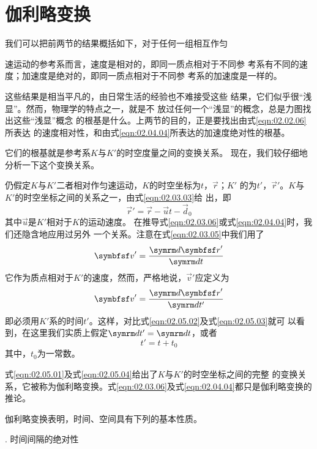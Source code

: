 \section{伽利略变换}\label{sec:02.05}

我们可以把前两节的结果概括如下，对于任何一组相互作匀

\noindent 速运动的参考系而言，速度是相对的，即同一质点相对于不同参
考系有不同的速度；加速度是绝对的，即同一质点相对于不同参
考系的加速度是一样的。

这些结果是相当平凡的，由日常生活的经验也不难接受这些
结果，它们似乎很“浅显”。然而，物理学的特点之一，就是不
放过任何一个“浅显”的概念，总是力图找出这些“浅显”概念
的根基是什么。上两节的目的，正是要找出由式\eqref{eqn:02.02.06}所表达
的速度相对性，和由式\eqref{eqn:02.04.04}所表达的加速度绝对性的根基。

它们的根基就是参考系$K$与$K'$的时空度量之间的变换关系。
现在，我们较仔细地分析一下这个变换关系。

仍假定$K$与$K'$二者相对作匀速运动，$K$的时空坐标为$t$，$\vec{r}$；$K'$
的为$t'$，$\vec{r}'$。$K$与$K'$的时空坐标之间的关系之一，由式\eqref{eqn:02.03.03}给
出，即
\begin{equation}\label{eqn:02.05.01}
  \vec{r}'=\vec{r}-\vec{u} t -\vec{d}_0
\end{equation}
其中$\vec{u}$是$K'$相对于$K$的运动速度。
在推导式\eqref{eqn:02.03.06}或式\eqref{eqn:02.04.04}时，我们还隐含地应用过另外
一个关系。注意在式\eqref{eqn:02.03.05}中我们用了
\begin{equation}\label{eqn:02.05.02}
  \vec{v}'=\frac{\dif \vec{r}'}{\dif t}
\end{equation}
它作为质点相对于$K'$的速度，然而，严格地说，$\vec{v}'$应定义为
\begin{equation}\label{eqn:02.05.03}
  \vec{v}'=\frac{\dif \vec{r}'}{\dif t'}
\end{equation}
即必须用$K'$系的时间$t'$。这样，对比式\eqref{eqn:02.05.02}及式\eqref{eqn:02.05.03}就可
以看到，在这里我们实质上假定$\dif t'=\dif t$，或者
\begin{equation}\label{eqn:02.05.04}
  t'=t+t_0
\end{equation}
其中，$t_0$为一常数。

式\eqref{eqn:02.05.01}及式\eqref{eqn:02.05.04}给出了$K$与$K'$的时空坐标之间的完整
的变换关系，它被称为伽利略变换。式\eqref{eqn:02.03.06}及式\eqref{eqn:02.04.04}都只是伽利略变换的推论。

伽利略变换表明，时间、空间具有下列的基本性质。

. 时间间隔的绝对性 \normalfont

